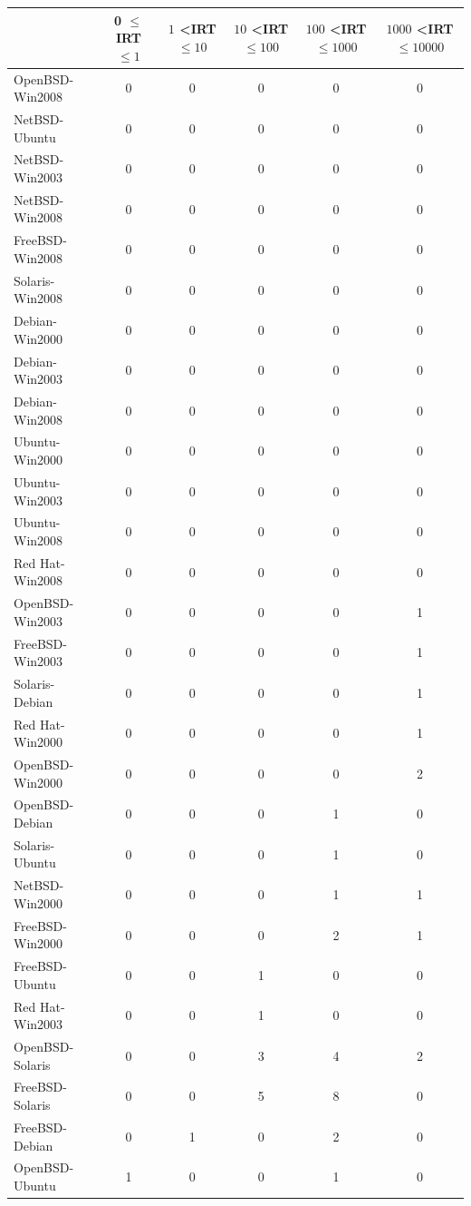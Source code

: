 \begin{table}[!ht]
\begin{center}
{\scriptsize
\begin{tabular}{|l||c c c c c|}\hline
&	0 $\leq$ IRT $\leq 1$	&	$1$ \textless IRT $\leq 10$	&	$10$ \textless IRT $\leq100$	&	$100$ \textless IRT $\leq 1000$	& $1000$ \textless IRT $\leq10000$\\\hline
OpenBSD-Win2008 & 0 & 0 & 0 & 0 & 0 \\
NetBSD-Ubuntu & 0 & 0 & 0 & 0 & 0 \\
NetBSD-Win2003 & 0 & 0 & 0 & 0 & 0 \\
NetBSD-Win2008 & 0 & 0 & 0 & 0 & 0 \\
FreeBSD-Win2008 & 0 & 0 & 0 & 0 & 0 \\
Solaris-Win2008 & 0 & 0 & 0 & 0 & 0 \\
Debian-Win2000 & 0 & 0 & 0 & 0 & 0 \\
Debian-Win2003 & 0 & 0 & 0 & 0 & 0 \\
Debian-Win2008 & 0 & 0 & 0 & 0 & 0 \\
Ubuntu-Win2000 & 0 & 0 & 0 & 0 & 0 \\
Ubuntu-Win2003 & 0 & 0 & 0 & 0 & 0 \\
Ubuntu-Win2008 & 0 & 0 & 0 & 0 & 0 \\
Red Hat-Win2008 & 0 & 0 & 0 & 0 & 0 \\ \hline
OpenBSD-Win2003 & 0 & 0 & 0 & 0 & 1 \\
FreeBSD-Win2003 & 0 & 0 & 0 & 0 & 1 \\
Solaris-Debian & 0 & 0 & 0 & 0 & 1 \\
Red Hat-Win2000 & 0 & 0 & 0 & 0 & 1 \\
OpenBSD-Win2000 & 0 & 0 & 0 & 0 & 2 \\ \hline
OpenBSD-Debian & 0 & 0 & 0 & 1 & 0 \\
Solaris-Ubuntu & 0 & 0 & 0 & 1 & 0 \\
NetBSD-Win2000 & 0 & 0 & 0 & 1 & 1 \\
FreeBSD-Win2000 & 0 & 0 & 0 & 2 & 1 \\ \hline
FreeBSD-Ubuntu & 0 & 0 & 1 & 0 & 0 \\
Red Hat-Win2003 & 0 & 0 & 1 & 0 & 0 \\
OpenBSD-Solaris & 0 & 0 & 3 & 4 & 2 \\
FreeBSD-Solaris & 0 & 0 & 5 & 8 & 0 \\ \hline
FreeBSD-Debian & 0 & 1 & 0 & 2 & 0 \\ \hline
OpenBSD-Ubuntu & 1 & 0 & 0 & 1 & 0  \\

\end{tabular}}
\end{center}
\end{table}
